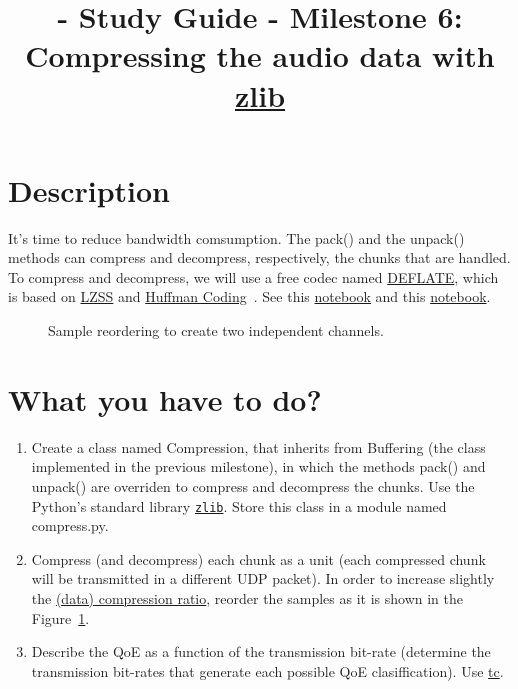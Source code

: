 
\title{\TM{} - Study Guide - Milestone 6: Compressing the audio data with \href{https://zlib.net/}{zlib}}

\maketitle

\section{Description}

It's time to reduce bandwidth comsumption. The pack() and the unpack()
methods can compress and decompress, respectively, the chunks that are
handled. To compress and decompress, we will use a free codec named
\href{https://en.wikipedia.org/wiki/DEFLATE}{DEFLATE}, which is based
on
\href{https://en.wikipedia.org/wiki/Lempel%E2%80%93Ziv%E2%80%93Storer%E2%80%93Szymanski}{LZSS}
  and \href{https://en.wikipedia.org/wiki/Huffman_coding}{Huffman
    Coding}~\cite{nelson96datacompression}. See this
  \href{https://github.com/vicente-gonzalez-ruiz/LZ77}{notebook} and
  this
  \href{https://vicente-gonzalez-ruiz.github.io/Huffman_coding/}{notebook}.

\begin{figure}
  \begin{center}
  \end{center}
  \caption{Sample reordering to create two independent channels.}
  \label{fig:reordering}
\end{figure}

\section{What you have to do?}

\begin{enumerate}
  
\item Create a class named Compression, that inherits from
  Buffering (the class implemented in the previous milestone),
  in which the methods pack() and unpack() are
  overriden to compress and decompress the chunks. Use the Python's
  standard library
  \href{https://docs.python.org/3/library/zlib.html}{\texttt{zlib}}. Store
  this class in a module named compress.py.
  
\item Compress (and decompress) each chunk as a unit (each compressed
  chunk will be transmitted in a different UDP packet). In order to
  increase slightly the
  \href{https://en.wikipedia.org/wiki/Data_compression_ratio}{(data)
    compression ratio}, reorder the samples as it is shown in the
  Figure~\ref{fig:reordering}.

\item Describe the QoE as a function of the transmission bit-rate
  (determine the transmission bit-rates that generate each possible
  QoE clasiffication). Use
  \href{https://man7.org/linux/man-pages/man8/tc.8.html}{tc}.
\end{enumerate}

